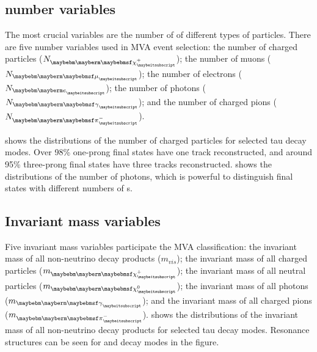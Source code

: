 \subsection{\PFOs number variables}

The most crucial variables are the number of \PFOs of different types of particles. There are five \PFOs number variables used in MVA event selection: the number of charged particles (${N}_{\charge}$); the number of muons (${N}_{\Pmu}$); the number of electrons (${N}_{\Pe}$); the number of photons (${N}_{\Pgg}$); and the number of charged pions (${N}_{\Pgpm}$).

 shows the distributions of the number of charged particles for selected tau decay modes. Over 98\% one-prong final states have one track reconstructed, and around 95\%  three-prong final states have three tracks reconstructed.  shows the distributions of the number of photons, which is powerful to distinguish final states with different numbers of \Ppizero s.


\subsection{Invariant mass variables}

Five invariant mass variables participate the MVA classification: the invariant mass of all non-neutrino decay products ($m_{vis}$); the invariant mass of all charged particles ($m_{\charge}$); the invariant mass of all neutral particles ($m_{\neutral}$); the invariant mass of all photons ($m_{\Pgg}$); and the invariant mass of all charged pions ($m_{\Pgpm}$).  shows the distributions of the invariant mass of all non-neutrino decay products for selected tau decay modes. Resonance structures can be seen for \Prho and \Pai decay modes in the figure.


